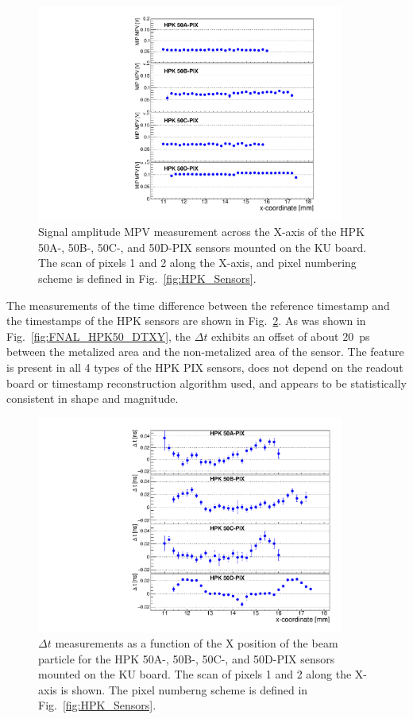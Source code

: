 \documentclass[preprint,1p]{elsarticle}
\begin{document}
\begin{figure}[htbp] 
\centering
\includegraphics[width=0.9\textwidth]{figs/KUBoard_HPK50ABCD/KUBoard_50ABCD_MPV.pdf} 
\caption{Signal amplitude MPV measurement across the X-axis of the HPK 50A-, 50B-, 50C-, and 50D-PIX sensors mounted on the KU board. The scan of pixels 1 and 2 along the X-axis, and pixel numbering scheme is defined in Fig.~\ref{fig:HPK_Sensors}.} 
\label{fig:KUBoard_50ABCD_MPV} 
\end{figure} 

The measurements of the time difference between the reference timestamp and the timestamps of the HPK sensors are shown in
Fig.~\ref{fig:KUBoard_50ABCD_MeanTime}. As was shown in
Fig.~\ref{fig:FNAL_HPK50_DTXY}, the $\Delta t$ exhibits an offset of about $20$~ps 
between the metalized area and the non-metalized area of the sensor. 
The feature is present in all 4 types of the HPK PIX sensors, does not depend on the readout board or timestamp
reconstruction algorithm used, and appears to be statistically consistent in shape and magnitude. 

\begin{figure}[htbp] 
\centering
\includegraphics[width=0.9\textwidth]{figs/KUBoard_HPK50ABCD/KUBoard_50ABCD_MeanTime.pdf} 
\caption{$\Delta t$ measurements as a function of the X position of the beam particle 
for the HPK 50A-, 50B-, 50C-, and 50D-PIX sensors mounted on the KU board. The scan 
of pixels 1 and 2 along the X-axis is shown. The pixel numberng scheme is defined 
in Fig.~\ref{fig:HPK_Sensors}.} 
\label{fig:KUBoard_50ABCD_MeanTime} 
\end{figure} 
\end{document}

